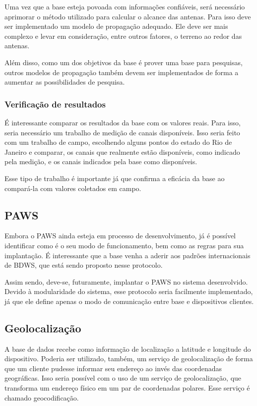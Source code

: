 	Uma vez que a base esteja povoada com informações confiáveis, será necessário aprimorar o método utilizado para calcular o alcance das antenas. Para isso deve ser implementado um modelo de propagação adequado. Ele deve ser mais complexo e levar em consideração, entre outros fatores, o terreno ao redor das antenas.

	Além disso, como um dos objetivos da base é prover uma base para pesquisas, outros modelos de propagação também devem ser implementados de forma a aumentar as possibilidades de pesquisa.

\subsubsection{Verificação de resultados}

	É interessante comparar os resultados da base com os valores reais. Para isso, seria necessário um trabalho de medição de canais disponíveis. Isso seria feito com um trabalho de campo, escolhendo alguns pontos do estado do Rio de Janeiro e comparar, os canais que realmente estão disponíveis, como indicado pela medição, e os canais indicados pela base como disponíveis.

	Esse tipo de trabalho é importante já que confirma a eficácia da base ao compará-la com valores coletados em campo.

\subsection{PAWS}

	Embora o PAWS ainda esteja em processo de desenvolvimento, já é possível identificar como é o seu modo de funcionamento, bem como as regras para sua implantação. É interessante que a base venha a aderir aos padrões internacionais de BDWS, que está sendo proposto nesse protocolo.

	Assim sendo, deve-se, futuramente, implantar o PAWS no sistema desenvolvido. Devido à modularidade do sistema, esse protocolo seria facilmente implementado, já que ele define apenas o modo de comunicação entre base e dispositivos clientes.


\subsection{Geolocalização}

	A base de dados recebe como informação de localização a latitude e longitude do dispositivo. Poderia ser utilizado, também, um serviço de geolocalização de forma que um cliente pudesse informar seu endereço ao invés das coordenadas geográficas. Isso seria possível com o uso de um serviço de geolocalização, que transforma um endereço físico em um par de coordenadas polares. Esse serviço é chamado geocodificação.

